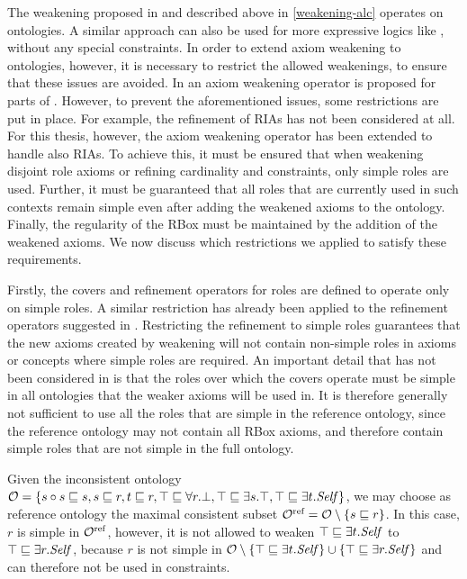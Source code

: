 The weakening proposed in \cite{troquard2018repairing} and described above in \cref{weakening-alc} operates on \ALC ontologies. A similar approach can also be used for more expressive logics like \ALCHOIQ, without any special constraints. In order to extend axiom weakening to \SROIQ ontologies, however, it is necessary to restrict the allowed weakenings, to ensure that these issues are avoided. In \cite{confalonieri2020towards} an axiom weakening operator is proposed for parts of \SROIQ. However, to prevent the aforementioned issues, some restrictions are put in place. For example, the refinement of RIAs has not been considered at all. For this thesis, however, the axiom weakening operator has been extended to handle also RIAs. To achieve this, it must be ensured that when weakening disjoint role axioms or refining cardinality and \self constraints, only simple roles are used. Further, it must be guaranteed that all roles that are currently used in such contexts remain simple even after adding the weakened axioms to the ontology. Finally, the regularity of the RBox must be maintained by the addition of the weakened axioms. We now discuss which restrictions we applied to satisfy these requirements.

Firstly, the covers and refinement operators for roles are defined to operate only on simple roles. A similar restriction has already been applied to the refinement operators suggested in \cite{confalonieri2020towards}. Restricting the refinement to simple roles guarantees that the new axioms created by weakening will not contain non-simple roles in axioms or concepts where simple roles are required. An important detail that has not been considered in \cite{confalonieri2020towards} is that the roles over which the covers operate must be simple in all ontologies that the weaker axioms will be used in. It is therefore generally not sufficient to use all the roles that are simple in the reference ontology, since the reference ontology may not contain all RBox axioms, and therefore contain simple roles that are not simple in the full ontology.

\begin{example}
  Given the inconsistent ontology $\mathcal{O} = \{ s \circ s \sqsubseteq s, s \sqsubseteq r, t \sqsubseteq r, \top \sqsubseteq \forall r.\bot, \top \sqsubseteq \exists s.\top, \top \sqsubseteq \exists t.\mathit{Self} \}$, we may choose as reference ontology the maximal consistent subset ${\mathcal{O}^\textnormal{ref}} = \mathcal{O} \setminus \{ s \sqsubseteq r \}$. In this case, $r$ is simple in ${\mathcal{O}^\textnormal{ref}}$, however, it is not allowed to weaken $\top \sqsubseteq \exists t.\mathit{Self}$ to $\top \sqsubseteq \exists r.\mathit{Self}$, because $r$ is not simple in $\mathcal{O} \setminus \{ \top \sqsubseteq \exists t.\mathit{Self} \} \cup \{ \top \sqsubseteq \exists r.\mathit{Self} \}$ and can therefore not be used in \self constraints.
\end{example}

